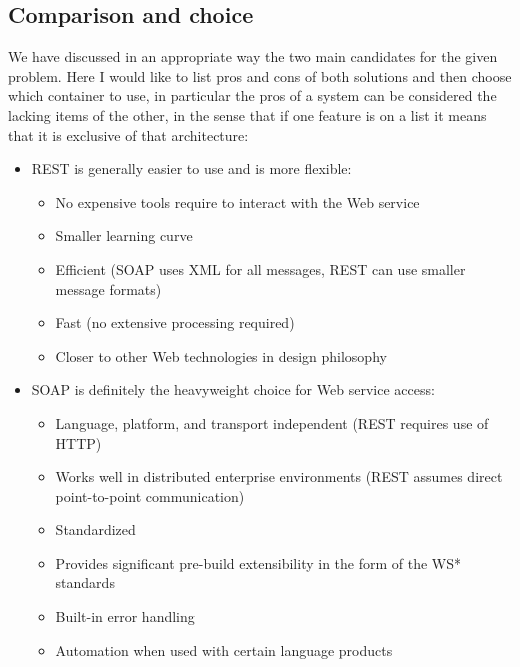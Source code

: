 \subsection{Comparison and choice}
We have discussed in an appropriate way the two main candidates for the given problem. Here I would like to list pros and cons of both solutions and then choose which container to use, in particular the pros of a system can be considered the lacking items of the other, in the sense that if one feature is on a list it means that it is exclusive of that architecture:
\begin{itemize}
\item REST is generally easier to use and is more flexible:
	\begin{itemize}

		\item No expensive tools require to interact with the Web service 
		
		\item Smaller learning curve

		\item Efficient (SOAP uses XML for all messages, REST can use smaller message formats)
	
		\item Fast (no extensive processing required)
	
		\item Closer to other Web technologies in design philosophy
	
	\end{itemize}

\item SOAP is definitely the heavyweight choice for Web service access:
	\begin{itemize}

		\item Language, platform, and transport independent (REST requires use of HTTP)
	
		\item Works well in distributed enterprise environments (REST assumes direct point-to-point communication)
	
		\item Standardized
	
		\item Provides significant pre-build extensibility in the form of the WS* standards
	
		\item Built-in error handling
	
		\item Automation when used with certain language products
	
	\end{itemize}	
	
\end{itemize}

